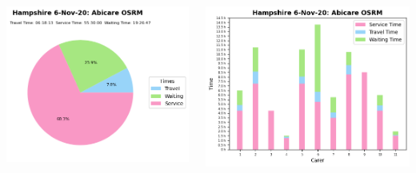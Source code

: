 \documentclass[usenames,dvipsnames]{beamer}
\begin{document}
\begin{frame} %
	\begin{columns}
		\begin{minipage}[c][0.45\textheight][c]{\linewidth}
			\centering
			\includegraphics[width=1\linewidth]{figures/6_Nov_20_Hampshire_time_info_abiosrm}
		\end{minipage}
		\begin{minipage}[c][0.45\textheight][c]{\linewidth}
			\vspace{5mm}
			\centering
			\includegraphics[width=1\linewidth]{figures/6_Nov_20_Hampshire_workload_abiosrm}

\end{minipage}
\end{columns}
\end{frame}
\end{document}
